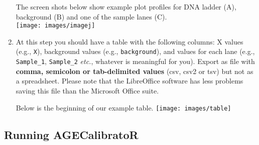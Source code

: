 \documentclass[11pt]{article}
\begin{document}
\begin{enumerate}
The screen shots below show example plot profiles for DNA ladder (A), background (B) and one of the sample lanes (C). \\ 

\bigskip 
\texttt{[image: images/imagej]}


\item At this step you should have a table with the following columns: X values (e.g., \texttt{X}), background values (e.g., \texttt{background}), and values for each lane (e.g., \texttt{Sample\_1}, \texttt{Sample\_2} \textit{etc.}, whatever is meaningful for you). Export as file with \textbf{comma, semicolon or tab-delimited values} (csv, csv2 or tsv) but not as a spreadsheet. 
Please note that the LibreOffice software has less problems saving this file than the Microsoft Office suite.


Below is the beginning of our example table. 
\bigskip \newline
\texttt{[image: images/table]} 

\end{enumerate}


\newpage

\subsection*{Running AGECalibratoR}
\end{document}
